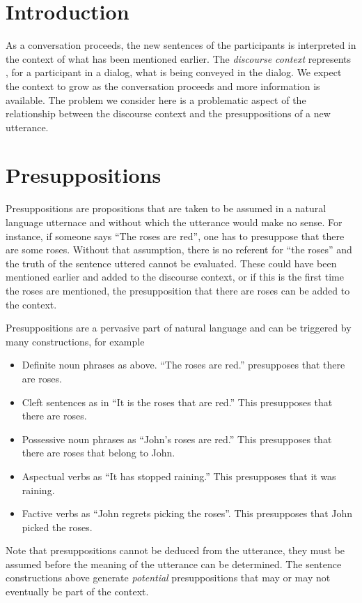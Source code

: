 \documentclass{article}
\begin{document}
\section{Introduction}

As a conversation proceeds, the new sentences of the participants is
interpreted in the context of what has been mentioned earlier. The
{\em discourse context} represents , for a participant in a dialog,
what is being conveyed in the dialog. We expect the context to grow as
the conversation proceeds and more information is available. The
problem we consider here is a problematic aspect of the relationship
between the discourse context and the presuppositions of a new
utterance. 


\section{Presuppositions}

Presuppositions are propositions that are taken to be assumed in a
natural language utternace and without which the utterance would make
no sense. For instance, if someone says ``The roses are red'', one has
to presuppose that there are some roses. Without that assumption,
there is no referent for ``the roses'' and the truth of the sentence
uttered cannot be evaluated. These could have been mentioned earlier
and added to the discourse context, or if this is the first time the
roses are mentioned, the presupposition that there are roses can be
added to the context.

Presuppositions are a pervasive part of natural language and can be
triggered by many constructions, for example
\begin{itemize}
\item Definite noun phrases as above. ``The roses are red.''
presupposes that there are roses.
\item Cleft sentences as in ``It is the roses that are red.'' This
presupposes that there are roses.
\item Possessive noun phrases as ``John's roses are red.'' This
presupposes that there are roses that belong to John.
\item Aspectual verbs as ``It has stopped raining.'' This presupposes
that it was raining.
\item Factive verbs as ``John regrets picking the roses''. This
presupposes that John picked the roses.
\end{itemize}

Note that presuppositions cannot be deduced from the utterance, they
must be assumed before the meaning of the utterance can be determined.
The sentence constructions above generate {\em potential}
presuppositions that may or may not eventually be part of the context.
\end{document}
